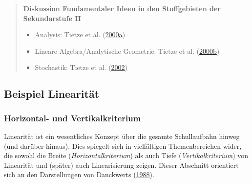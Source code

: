 \documentclass[
]{scrbook}
\providecommand{\tightlist}{%
  \setlength{\itemsep}{0pt}\setlength{\parskip}{0pt}}
\theoremstyle{definition}
\theoremstyle{definition}
\theoremstyle{definition}
\theoremstyle{definition}
\theoremstyle{remark}
\begin{document}
\begin{quote}
\textbf{Diskussion Fundamentaler Ideen in den Stoffgebieten der Sekundarstufe II}

\begin{itemize}
\tightlist
\item
  Analysis: Tietze et al. (\protect\hyperlink{ref-Tietze:2000a}{2000a})
\item
  Lineare Algebra/Analytische Geometrie: Tietze et al. (\protect\hyperlink{ref-Tietze:2000}{2000b})
\item
  Stochastik: Tietze et al. (\protect\hyperlink{ref-Tietze:2002}{2002})
\end{itemize}
\end{quote}

\hypertarget{beispiel-linearitaet}{%
\subsection{Beispiel Linearität}\label{beispiel-linearitaet}}

\hypertarget{horizontal--und-vertikalkriterium}{%
\subsubsection{Horizontal- und Vertikalkriterium}\label{horizontal--und-vertikalkriterium}}

Linearität ist ein wesentliches Konzept über die gesamte Schullaufbahn hinweg (und darüber hinaus). Dies spiegelt sich in vielfältigen Themenbereichen wider, die sowohl die Breite (\emph{Horizontalkriterium}) als auch Tiefe (\emph{Vertikalkriterium}) von Linearität und (später) auch Linearisierung zeigen. Dieser Abschnitt orientiert sich an den Darstellungen von Danckwerts (\protect\hyperlink{ref-Danckwerts:1988}{1988}).
\end{document}
